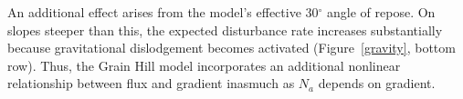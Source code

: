 \documentclass[esurf, manuscript]{copernicus}
\begin{document}
An additional effect arises from the model's effective 30$^\circ$ angle of repose. On slopes steeper than this, the expected disturbance rate increases substantially because gravitational dislodgement becomes activated (Figure~\ref{gravity}, bottom row). Thus, the Grain Hill model incorporates an additional nonlinear relationship between flux and gradient inasmuch as $N_a$ depends on gradient.

\end{document}
